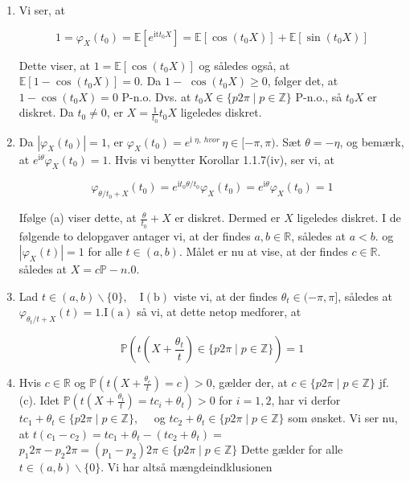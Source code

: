 \documentclass{Class}
\newcommand{\1}{\mathbbm{1}}
\theoremstyle{boxed}
\begin{document}
\begin{enumerate}
  \item Vi ser, at

  $$
  1=\varphi_X\left(t_0\right)=\mathbb{E}\left[e^{\mathrm{it} t_0 X}\right]=\mathbb{E}\left[\cos \left(t_0 X\right)\right]+\mathbb{E}\left[\sin \left(t_0 X\right)\right]
  $$
  
  
  Dette viser, at $1=\mathbb{E}\left[\cos \left(t_0 X\right)\right]$ og således også, at $\mathbb{E}\left[1-\cos \left(t_0 X\right)\right]=0$. Da $1-$ $\cos \left(t_0 X\right) \geq 0$, følger det, at $1-\cos \left(t_0 X\right)=0$ P-n.o. Dvs. at $t_0 X \in\{p 2 \pi \mid p \in \mathbb{Z}\}$ P-n.o., så $t_0 X$ er diskret. Da $t_0 \neq 0$, er $X=\frac{1}{t_0} t_0 X$ ligeledes diskret.
  \item Da $\left|\varphi_X\left(t_0\right)\right|=1$, er $\varphi_X\left(t_0\right)=e^{\text {i } \eta, ~ h v o r ~} \eta \in[-\pi, \pi)$. Sæt $\theta=-\eta$, og bemærk, at $e^{\mathrm{i} \theta} \varphi_X\left(t_0\right)=1$. Hvis vi benytter Korollar 1.1.7(iv), ser vi, at

  $$
  \varphi_{\theta / t_0+X}\left(t_0\right)=e^{\mathrm{i} t_0 \theta / t_0} \varphi_X\left(t_0\right)=e^{\mathrm{i} \theta} \varphi_X\left(t_0\right)=1
  $$
  
  
  Ifølge (a) viser dette, at $\frac{\theta}{t_0}+X$ er diskret. Dermed er $X$ ligeledes diskret. I de følgende to delopgaver antager vi, at der findes $a, b \in \mathbb{R}$, således at $a<b$. og $\left|\varphi_X(t)\right|=1$ for alle $t \in(a, b)$. Målet er nu at vise, at der findes $c \in \mathbb{R}$. således at $X=c \mathbb{P}-n .0$.
  \item Lad $t \in(a, b) \backslash\{0\}, \quad \mathrm{I}(\mathrm{b})$ viste vi, at der findes $\theta_t \in(-\pi, \pi]$, således at $\varphi_{\theta_t / t+X}(t)=1 . \mathrm{I}(\mathrm{a})$ så vi, at dette netop medforer, at

  $$
  \mathbb{P}\left(t\left(X+\frac{\theta_t}{t}\right) \in\{p 2 \pi \mid p \in \mathbb{Z}\}\right)=1
  $$
  \item Hvis $c \in \mathbb{R}$ og $\mathbb{P}\left(t\left(X+\frac{\theta_e}{t}\right)=c\right)>0$, gælder der, at $c \in\{p 2 \pi \mid p \in \mathbb{Z}\}$ jf. (c). Idet $\mathbb{P}\left(t\left(X+\frac{\theta_t}{t}\right)=t c_i+\theta_t\right)>0$ for $i=1,2$, har vi derfor $t c_1+\theta_t \in\{p 2 \pi \mid p \in \mathbb{Z}\}, \quad$ og $t c_2+\theta_t \in\{p 2 \pi \mid p \in \mathbb{Z}\}$ som ønsket. Vi ser nu, at $t\left(c_1-c_2\right)=t c_1+\theta_t-\left(t c_2+\theta_t\right)=$ $p_1 2 \pi-p_2 2 \pi=\left(p_1-p_2\right) 2 \pi \in\{p 2 \pi \mid p \in \mathbb{Z}\}$ Dette gælder for alle $t \in(a, b) \backslash\{0\}$. Vi har altså mængdeindklusionen


\end{enumerate}
\end{document}

